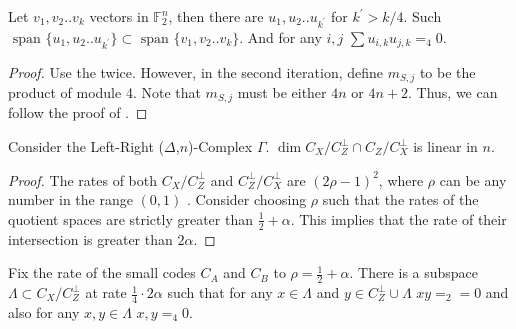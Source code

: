 \documentclass[manuscript,screen,review]{acmart}
\begin{document}
  \begin{claim}
    Let $v_{1},v_{2}..v_{k}$ vectors in $\mathbb{F}_{2}^{n}$, then there are $u_{1},u_{2}..u_{k^{\prime}}$ for $k^{\prime} > k/4$. Such $\text{ span } \{   u_{1},u_{2}..u_{k^{\prime}} \} \subset \text{ span } \{ v_{1},v_{2}..v_{k} \}$. And for any $i,j$ $\sum u_{i,k}u_{j,k} =_{4} 0$. 
  \end{claim}
\begin{proof}
Use the  twice. However, in the second iteration, define $m_{S,j}$ to be the product of module 4. Note that $m_{S,j}$ must be either $4n$ or $4n+2$. Thus, we can follow the proof of .
\end{proof}

\begin{claim}
  Consider the Left-Right ($\Delta$,$n$)-Complex $\Gamma$. $\dim C_{X}/C_{Z}^{\perp} \cap C_{Z} / C_{X}^{\perp}$ is linear in $n$. 
\end{claim}
\begin{proof}
The rates of both $C_{X}/C_{Z}^{\perp}$ and $C_{Z}^{\perp}/C_{X}^{\perp}$ are $(2\rho-1)^{2}$, where $\rho$ can be any number in the range $(0,1)$ \cite{leverrier2022quantum}. Consider choosing $\rho$ such that the rates of the quotient spaces are strictly greater than $\frac{1}{2} + \alpha$. This implies that the rate of their intersection is greater than $2\alpha$.
\end{proof}

\begin{corollary}
  Fix the rate of the small codes $C_{A}$ and $C_{B}$ to $\rho = \frac{1}{2} + \alpha$.  There is a subspace $\Lambda \subset C_{X}/C_{Z}^{\perp}$ at rate $\frac{1}{4} \cdot  2\alpha$ such that for any $x \in \Lambda$ and $y \in C_{Z}^{\perp} \cup \Lambda$ $xy =_{2} = 0$ and also for any $x,y \in \Lambda$ $x,y =_{4} 0$. 
\end{corollary}
\end{document}
